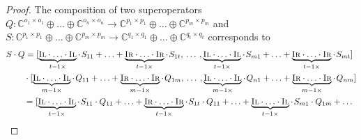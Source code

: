   \begin{proof}
  The composition of two superoperators $Q: \mathbb{C}^{o_1 \times o_1} \oplus \ldots \oplus \mathbb{C}^{o_n \times o_n}  \rightarrow \mathbb{C}^{p_1 \times p_1} \oplus \ldots \oplus  \mathbb{C}^{p_m \times p_m}$ and $S: \mathbb{C}^{p_1 \times p_1} \oplus \ldots \oplus \mathbb{C}^{p_m \times p_m}  \rightarrow \mathbb{C}^{q_1 \times q_1} \oplus \ldots \oplus \mathbb{C}^{q_t \times q_t}$ corresponds to 
  \begin{equation}
    \begin{split}
      & S \cdot  Q =[\underbrace{\textsc{Il} \cdot \ldots \cdot \textsc{Il}}_{t-1 \times} \cdot \hspace{1pt} S_{11} + \ldots +   \underbrace{\textsc{Ir} \cdot \ldots \cdot \textsc{Ir}}_{t-1 \times}\cdot \hspace{1pt} S_{1t},  \hspace{2pt} \ldots  \hspace{2pt},  \underbrace{\textsc{Il} \cdot \ldots \cdot \textsc{Il}}_{t-1 \times} \cdot\hspace{1pt} S_{m1} + \ldots + \underbrace{\textsc{Ir} \cdot \ldots \cdot \textsc{Ir}}_{t-1 \times}\cdot \hspace{1pt} S_{mt}] \\
       & \hspace{21pt}\cdot  [\underbrace{\textsc{Il} \cdot \ldots \cdot \textsc{Il}}_{m-1 \times} \cdot \hspace{1pt} Q_{11} + \ldots +   \underbrace{\textsc{Ir} \cdot \ldots \cdot \textsc{Ir}}_{m-1 \times}\cdot \hspace{1pt} Q_{1m},  \hspace{2pt} \ldots  \hspace{2pt},  \underbrace{\textsc{Il} \cdot \ldots \cdot \textsc{Il}}_{m-1 \times} \cdot\hspace{1pt} Q_{n1} + \ldots + \underbrace{\textsc{Ir} \cdot \ldots \cdot \textsc{Ir}}_{m-1 \times}\cdot \hspace{1pt} Q_{nm}]  \\
       & \hspace{21pt} = [ \underbrace{\textsc{Il} \cdot \ldots \cdot \textsc{Il}}_{t-1 \times} \cdot \hspace{1pt} S_{11} \cdot Q_{11} + \ldots +   \underbrace{\textsc{Ir} \cdot \ldots \cdot \textsc{Ir}}_{t-1 \times}\cdot \hspace{1pt} S_{1t} \cdot Q_{11} + \ldots +  \underbrace{\textsc{Il} \cdot \ldots \cdot \textsc{Il}}_{t-1 \times} \cdot\hspace{1pt} S_{m1} \cdot Q_{1m} +  \ldots \\

\end{split}
\end{equation}
\end{proof}
